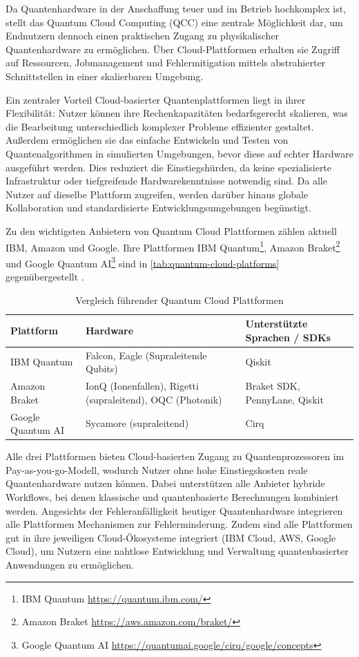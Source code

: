 Da Quantenhardware in der Anschaffung teuer und im Betrieb hochkomplex ist, stellt das Quantum Cloud Computing (QCC) eine zentrale Möglichkeit dar, um Endnutzern dennoch einen praktischen Zugang zu physikalischer Quantenhardware zu ermöglichen. Über Cloud-Plattformen erhalten sie Zugriff auf Ressourcen, Jobmanagement und Fehlermitigation mittels abstrahierter Schnittstellen in einer skalierbaren Umgebung.

Ein zentraler Vorteil Cloud-basierter Quantenplattformen liegt in ihrer Flexibilität: Nutzer können ihre Rechenkapazitäten bedarfsgerecht skalieren, was die Bearbeitung unterschiedlich komplexer Probleme effizienter gestaltet. Außerdem ermöglichen sie das einfache Entwickeln und Testen von Quantenalgorithmen in simulierten Umgebungen, bevor diese auf echter Hardware ausgeführt werden. Dies reduziert die Einstiegshürden, da keine spezialisierte Infrastruktur oder tiefgreifende Hardwarekenntnisse notwendig sind. Da alle Nutzer auf dieselbe Plattform zugreifen, werden darüber hinaus globale Kollaboration und standardisierte Entwicklungsumgebungen begünstigt.

Zu den wichtigsten Anbietern von Quantum Cloud Plattformen zählen aktuell IBM, Amazon und Google. Ihre Plattformen IBM Quantum\footnote{IBM Quantum \url{https://quantum.ibm.com/}}, Amazon Braket\footnote{Amazon Braket \url{https://aws.amazon.com/braket/}} und Google Quantum AI\footnote{Google Quantum AI \url{https://quantumai.google/cirq/google/concepts}} sind in \autoref{tab:quantum-cloud-platforms} gegenübergestellt \autocite{golec_quantum_2024}.

\begin{table}[ht!]
\centering
\begin{tabular}{|p{2.5cm}|p{4.8cm}|p{4cm}|}
\hline
\textbf{Plattform} & \textbf{Hardware} & \textbf{Unterstützte Sprachen / SDKs} \\
\hline
IBM Quantum & Falcon, Eagle (Supraleitende Qubits) & Qiskit \\
\hline
Amazon Braket & IonQ (Ionenfallen), Rigetti (supraleitend), OQC (Photonik) & Braket SDK, PennyLane, Qiskit \\
\hline
Google Quantum AI & Sycamore (supraleitend) & Cirq \\
\hline
\end{tabular}
\caption{Vergleich führender Quantum Cloud Plattformen}
\label{tab:quantum-cloud-platforms}
\end{table}

Alle drei Plattformen bieten Cloud-basierten Zugang zu Quantenprozessoren im Pay-as-you-go-Modell, wodurch Nutzer ohne hohe Einstiegskosten reale Quantenhardware nutzen können. Dabei unterstützen alle Anbieter hybride Workflows, bei denen klassische und quantenbasierte Berechnungen kombiniert werden. Angesichts der Fehleranfälligkeit heutiger Quantenhardware integrieren alle Plattformen Mechanismen zur Fehlerminderung. Zudem sind alle Plattformen gut in ihre jeweiligen Cloud-Ökosysteme integriert (IBM Cloud, AWS, Google Cloud), um Nutzern eine nahtlose Entwicklung und Verwaltung quantenbasierter Anwendungen zu ermöglichen.

